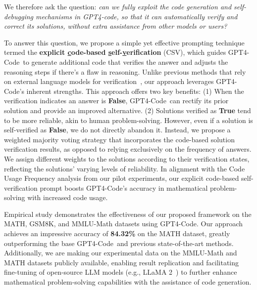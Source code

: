 \documentclass{article} \usepackage{iclr2023_conference,times}
\newcommand{\gptcode}{GPT4-Code}
\begin{document}
We therefore ask the question: \textit{can we fully exploit the code generation and self-debugging mechanisms in GPT4-code, so that it can automatically verify and correct its solutions, without extra assistance from other models or users?}

To answer this question, we propose a simple yet effective prompting technique termed the \textbf{explicit \uline{c}ode-based \uline{s}elf-\uline{v}erification} (CSV), which guides \gptcode~to generate additional code that verifies the answer and adjusts the reasoning steps if there's a flaw in reasoning. Unlike previous methods that rely on external language models for verification~\citep{lightman2023lets,cobbe2021gsm8k}, our approach leverages \gptcode's inherent strengths. This approach offers two key benefits: (1) When the verification indicates an answer is \textbf{False}, \gptcode~can rectify its prior solution and provide an improved alternative. (2) Solutions verified as \textbf{True} tend to be more reliable, akin to human problem-solving. However, even if a solution is self-verified as \textbf{False}, we do not directly abandon it. Instead, we propose a weighted majority voting strategy that incorporates the code-based solution verification results, as opposed to relying exclusively on the frequency of answers. We assign different weights to the solutions according to their verification states, reflecting the solutions' varying levels of reliability. In alignment with the Code Usage Frequency analysis from our pilot experiments, our explicit code-based self-verification prompt boosts \gptcode's accuracy in mathematical problem-solving with increased code usage.

Empirical study demonstrates the effectiveness of our proposed framework on the MATH, GSM8K, and MMLU-Math datasets using \gptcode. Our approach achieves an impressive accuracy of \textbf{84.32\%} on the MATH dataset, greatly outperforming the base \gptcode~and previous state-of-the-art methods. Additionally, we are making our experimental data on the MMLU-Math and MATH datasets publicly available, enabling result replication and facilitating fine-tuning of open-source LLM models (e.g., LLaMA 2~\citep{touvron2023llama}) to further enhance mathematical problem-solving capabilities with the assistance of code generation.
\end{document}
